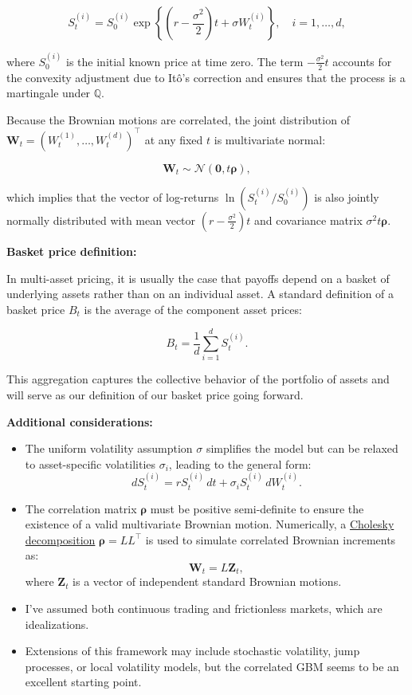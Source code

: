 \documentclass[titlepage]{article}
\begin{document}
\begin{equation}
S_t^{(i)} = S_0^{(i)} \exp\left\{\left(r - \frac{\sigma^2}{2}\right) t + \sigma W_t^{(i)}\right\}, \quad i=1, \ldots, d,
\label{eq:gbm_solution}
\end{equation}

where \(S_0^{(i)}\) is the initial known price at time zero. The term \(-\frac{\sigma^2}{2}t\) accounts for the convexity adjustment due to Itô’s correction and ensures that the process is a martingale under \(\mathbb{Q}\).

Because the Brownian motions are correlated, the joint distribution of \(\mathbf{W}_t = (W_t^{(1)}, \ldots, W_t^{(d)})^\top\) at any fixed \(t\) is multivariate normal:

\[
\mathbf{W}_t \sim \mathcal{N}\left(\mathbf{0}, t \boldsymbol{\rho}\right),
\]

which implies that the vector of log-returns \(\ln\left(S_t^{(i)}/S_0^{(i)}\right)\) is also jointly normally distributed with mean vector \(\left(r - \frac{\sigma^2}{2}\right)t \) and covariance matrix \(\sigma^2 t \boldsymbol{\rho}\).

\textbf{Basket price definition:}

In multi-asset pricing, it is usually the case that payoffs depend on a basket of underlying assets rather than on an individual asset. A standard definition of a basket price \( B_t \) is the average of the component asset prices:

\begin{equation}
B_t = \frac{1}{d} \sum_{i=1}^d S_t^{(i)}.
\label{eq:basket_price}
\end{equation}

This aggregation captures the collective behavior of the portfolio of assets and will serve as our definition of our basket price going forward.

\textbf{Additional considerations:}

\begin{itemize}
    \item The uniform volatility assumption \(\sigma\) simplifies the model but can be relaxed to asset-specific volatilities \(\sigma_i\), leading to the general form:
    \[
    dS_t^{(i)} = r S_t^{(i)}\, dt + \sigma_i S_t^{(i)}\, dW_t^{(i)}.
    \]
    \item The correlation matrix \(\boldsymbol{\rho}\) must be positive semi-definite to ensure the existence of a valid multivariate Brownian motion. Numerically, a \hyperref[sec:Cholesky]{Cholesky decomposition} \(\boldsymbol{\rho} = LL^\top\) is used to simulate correlated Brownian increments as:
    \[
    \mathbf{W}_t = L \mathbf{Z}_t,
    \]
    where \(\mathbf{Z}_t\) is a vector of independent standard Brownian motions.
    \item I've assumed both continuous trading and frictionless markets, which are idealizations.
    \item Extensions of this framework may include stochastic volatility, jump processes, or local volatility models, but the correlated GBM seems to be an excellent starting point.
\end{itemize}
\end{document}
